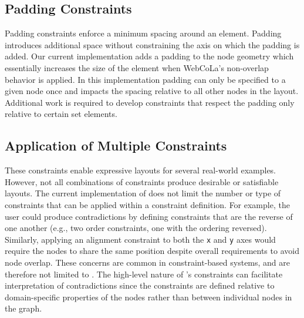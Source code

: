 
\subsection{Padding Constraints}
Padding constraints enforce a minimum spacing around an element.
Padding introduces additional space without constraining the
axis on which the padding is added. Our current implementation adds a
padding to the node geometry which essentially increases the size of the element
when WebCoLa's non-overlap behavior is applied. In this implementation
padding can only be specified to a given node once and impacts the spacing
relative to all other nodes in the layout.
Additional work is required to develop constraints that
respect the padding only relative to certain set elements.



\subsection{Application of Multiple Constraints}
\syphilisLayout
\syphilisSpec
These constraints enable expressive layouts for several real-world examples. However, not 
all combinations of constraints produce desirable or satisfiable layouts.
The current implementation of \projectname does not limit the number or
type of constraints that can be applied within a constraint definition.
For example, the user could produce contradictions by defining constraints
that are the reverse of one another (e.g., two order constraints, one with the
ordering reversed). Similarly, applying an alignment constraint to both the \texttt{x}
and \texttt{y} axes would require the nodes to share the same position despite
overall requirements to avoid node overlap. These concerns are common in
constraint-based systems, and are therefore not limited to \projectname.
The high-level nature of \projectname's constraints can facilitate
interpretation of contradictions since the constraints are defined
relative to domain-specific properties of the nodes rather than between
individual nodes in the graph.

